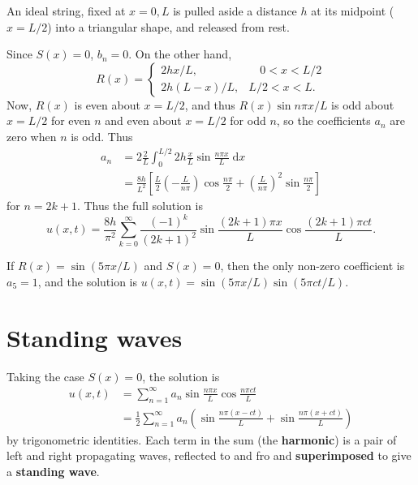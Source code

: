\documentclass[letter-paper]{tufte-book}
\newenvironment{example}[1][Example]{\begin{trivlist}
\item[\hskip \labelsep {\bfseries #1}]}{\end{trivlist}}
\newcommand\Def[1]{\textbf{#1}}
\begin{document}
\begin{example}
An ideal string, fixed at $x = 0, L$ is pulled aside a distance $h$ at its
midpoint ($x = L / 2$) into a triangular shape, and released from rest.

Since $S(x) = 0$, $b_n = 0$. On the other hand,
\begin{equation}
  R(x) = 
  \begin{cases}
    2h x / L, & \quad 0 < x < L/2\\
    2h(L - x) / L, & L / 2 < x < L.
  \end{cases}
\end{equation}
Now, $R(x)$ is even about $x = L / 2$, and thus $R(x) \sin n\pi x /L$ is odd
about $x = L / 2$ for even $n$ and even about $x = L / 2$ for odd $n$, so the
coefficients $a_n$ are zero when $n$ is odd. Thus
\begin{align*}
  a_n &= 2 \frac{2}{L} \int^{L/2}_0 2h \frac{x}{L} \sin\frac{n\pi x}{L}\; \mathrm{d}x \\
  &= \frac{8 h}{L^2}\left[\frac{L}{2}\left(-\frac{L}{n\pi}\right)\cos\frac{n\pi}{2} +
  \left(\frac{L}{n\pi}\right)^2 \sin\frac{n\pi}{2}\right]
\end{align*}
for $n = 2k+1$. Thus the full solution is
\begin{equation*}
  u(x, t) = \frac{8h}{\pi^2} \sum_{k=0}^\infty \frac{(-1)^k}{(2k + 1)^2} 
    \sin\frac{(2k+1) \pi x}{L}\cos\frac{(2k+1) \pi ct}{L}.
\end{equation*}
\end{example}

\begin{example}
If $R(x) = \sin(5\pi x / L)$ and $S(x) = 0$, then the only non-zero coefficient
is $a_5 = 1$, and the solution is $u(x, t) = \sin(5\pi x/L)\sin(5\pi ct / L)$.
\end{example}


\section{Standing waves}

Taking the case $S(x) = 0$, the solution is
\begin{align*}
  u(x,t) &= \sum_{n=1}^\infty a_n \sin\frac{n\pi x}{L} \cos\frac{n\pi ct}{L}\\
  &= \frac{1}{2} \sum_{n=1}^\infty a_n\left(\sin\frac{n\pi (x-ct)}{L} + \sin\frac{n\pi (x+ct)}{L}\right)
\end{align*}
by trigonometric identities. Each term in the sum (the \Def{harmonic}) is
a pair of left and right propagating waves, reflected to and fro and
\Def{superimposed} to give a \Def{standing wave}.
\end{document}
